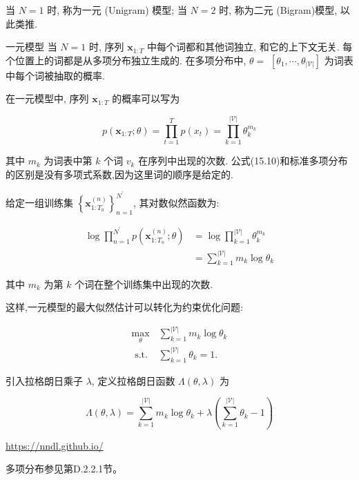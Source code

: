 \documentclass[10pt]{article}
\begin{document}
当 $N=1$ 时, 称为一元 (Unigram) 模型; 当 $N=2$ 时, 称为二元 (Bigram)模型, 以此类推.

一元模型 当 $N=1$ 时, 序列 $\boldsymbol{x}_{1: T}$ 中每个词都和其他词独立, 和它的上下文无关. 每个位置上的词都是从多项分布独立生成的. 在多项分布中, $\theta=$ $\left[\theta_{1}, \cdots, \theta_{|\mathcal{V}|}\right]$ 为词表中每个词被抽取的概率.

在一元模型中, 序列 $\boldsymbol{x}_{1: T}$ 的概率可以写为


\begin{equation*}
p\left(\boldsymbol{x}_{1: T} ; \theta\right)=\prod_{t=1}^{T} p\left(x_{t}\right)=\prod_{k=1}^{|\mathcal{V}|} \theta_{k}^{m_{k}} \tag{15.10}
\end{equation*}


其中 $m_{k}$ 为词表中第 $k$ 个词 $v_{k}$ 在序列中出现的次数. 公式(15.10)和标准多项分布的区别是没有多项式系数,因为这里词的顺序是给定的.

给定一组训练集 $\left\{\boldsymbol{x}_{1: T_{n}}^{(n)}\right\}_{n=1}^{N^{\prime}}$, 其对数似然函数为:


\begin{align*}
\log \prod_{n=1}^{N^{\prime}} p\left(\boldsymbol{x}_{1: T_{n}}^{(n)} ; \theta\right) & =\log \prod_{k=1}^{|\mathcal{V}|} \theta_{k}^{m_{k}}  \tag{15.11}\\
& =\sum_{k=1}^{|\mathcal{V}|} m_{k} \log \theta_{k} \tag{15.12}
\end{align*}


其中 $m_{k}$ 为第 $k$ 个词在整个训练集中出现的次数.

这样,一元模型的最大似然估计可以转化为约束优化问题:

\[
\begin{array}{ll}
\max _{\theta} & \sum_{k=1}^{|\mathcal{V}|} m_{k} \log \theta_{k} \\
\text { s.t. } & \sum_{k=1}^{|\mathcal{V}|} \theta_{k}=1 . \tag{15.14}
\end{array}
\]

引入拉格朗日乘子 $\lambda$, 定义拉格朗日函数 $\Lambda(\theta, \lambda)$ 为


\begin{equation*}
\Lambda(\theta, \lambda)=\sum_{k=1}^{|\mathcal{V}|} m_{k} \log \theta_{k}+\lambda\left(\sum_{k=1}^{|\mathcal{V}|} \theta_{k}-1\right) \tag{15.15}
\end{equation*}


\href{https://nndl.github.io/}{https://nndl.github.io/}

多项分布参见第D.2.2.1节。
\end{document}
